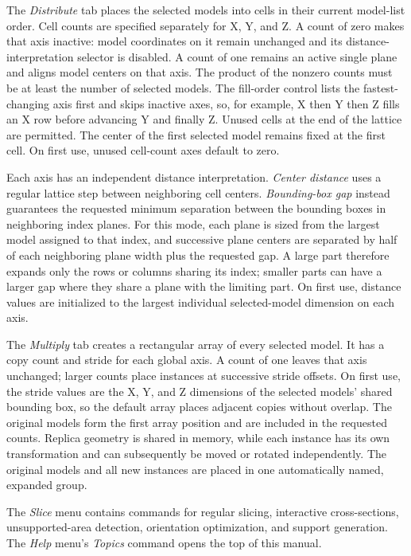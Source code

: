 \hypertarget{distribute-dialog}{}The \emph{Distribute} tab places the selected
models into cells in their current model-list order. Cell counts are specified
separately for X, Y, and Z. A count of zero makes that axis inactive: model
coordinates on it remain unchanged and its distance-interpretation selector is
disabled. A count of one remains an active single plane and aligns model
centers on that axis. The product of the nonzero counts must be at least the
number of selected models. The fill-order control lists the fastest-changing
axis first and skips inactive axes, so, for example, X then Y then Z fills an X
row before advancing Y and finally Z. Unused cells at the end of the lattice
are permitted. The center of the first selected model remains fixed at the
first cell. On first use, unused cell-count axes default to zero.

Each axis has an independent distance interpretation. \emph{Center distance}
uses a regular lattice step between neighboring cell centers.
\emph{Bounding-box gap} instead guarantees the requested minimum separation
between the bounding boxes in neighboring index planes. For this mode, each
plane is sized from the largest model assigned to that index, and successive
plane centers are separated by half of each neighboring plane width plus the
requested gap. A large part therefore expands only the rows or columns sharing
its index; smaller parts can have a larger gap where they share a plane with
the limiting part. On first use, distance values are initialized to the largest
individual selected-model dimension on each axis.

\hypertarget{multiply-dialog}{}The \emph{Multiply} tab creates a rectangular
array of every selected model. It has a copy count and stride for each global
axis. A count of one leaves that axis unchanged; larger
counts place instances at successive stride offsets. On first use, the stride
values are the X, Y, and Z dimensions of the selected models' shared bounding
box, so
the default array places adjacent copies without overlap. The original models
form the first array position and are included in the requested counts. Replica
geometry is shared in memory, while each instance has its own transformation
and can subsequently be moved or rotated independently. The original models
and all new instances are placed in one automatically named, expanded group.

The \emph{Slice} menu contains commands for regular slicing, interactive
cross-sections, unsupported-area detection, orientation optimization, and
support generation. The \emph{Help} menu's \emph{Topics} command opens the top
of this manual.

